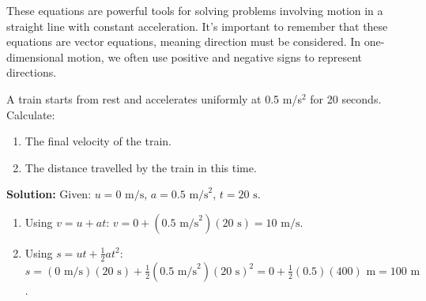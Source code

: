 These equations are powerful tools for solving problems involving motion in a straight line with constant acceleration.  It's important to remember that these equations are vector equations, meaning direction must be considered.  In one-dimensional motion, we often use positive and negative signs to represent directions.

\begin{example}
A train starts from rest and accelerates uniformly at 0.5 m/s$^2$ for 20 seconds. Calculate:
\begin{enumerate}
    \item The final velocity of the train.
    \item The distance travelled by the train in this time.
\end{enumerate}
\textbf{Solution:}
Given: $u = 0 \text{ m/s}$, $a = 0.5 \text{ m/s}^2$, $t = 20 \text{ s}$.

\begin{enumerate}
    \item Using $v = u + at$:
    $v = 0 + (0.5 \text{ m/s}^2)(20 \text{ s}) = 10 \text{ m/s}$.
    \item Using $s = ut + \frac{1}{2}at^2$:
    $s = (0 \text{ m/s})(20 \text{ s}) + \frac{1}{2}(0.5 \text{ m/s}^2)(20 \text{ s})^2 = 0 + \frac{1}{2}(0.5)(400) \text{ m} = 100 \text{ m}$.
\end{enumerate}
\end{example}

